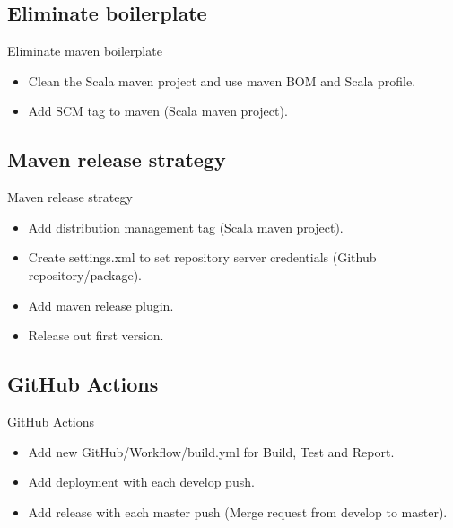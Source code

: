 \documentclass[
    aspectratio=1610
]{beamer}
\begin{document}
    \subsection{Eliminate boilerplate}\label{subsec:eliminate-boilerplate}
    \begin{frame}{Eliminate maven boilerplate}
        \begin{itemize}[<+- | alert@+>]
            \item Clean the Scala maven project and use maven BOM and Scala profile.
            \item Add SCM tag to maven (Scala maven project).
        \end{itemize}
    \end{frame}

    \subsection{Maven release strategy}\label{subsec:maven-release-strategy}
    \begin{frame}{Maven release strategy}
        \begin{itemize}[<+- | alert@+>]
            \item Add distribution management tag (Scala maven project).
            \item Create settings.xml to set repository server credentials (Github repository/package).
            \item Add maven release plugin.
            \item Release out first version.
        \end{itemize}
    \end{frame}

    \subsection{GitHub Actions}\label{subsec:github-actions}
    \begin{frame}{GitHub Actions}
        \begin{itemize}[<+- | alert@+>]
            \item Add new GitHub/Workflow/build.yml for Build, Test and Report.
            \item Add deployment with each develop push.
            \item Add release with each master push (Merge request from develop to master).
        \end{itemize}
    \end{frame}
\end{document}
